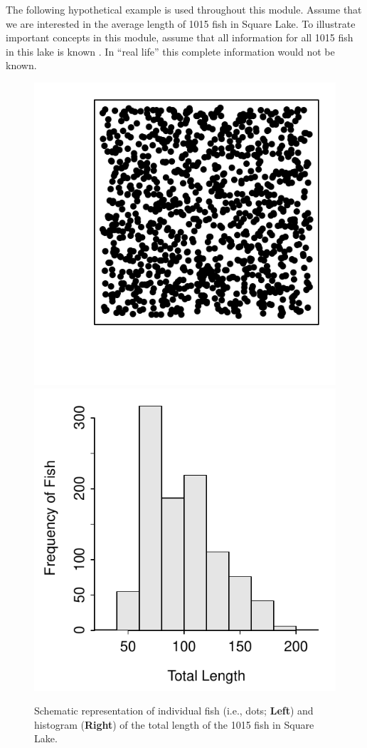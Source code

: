 \documentclass[10pt,openany]{book}\usepackage[]{graphicx}\usepackage[]{color}
\newenvironment{knitrout}{}{} %
\begin{document}
The following hypothetical example is used throughout this module. Assume that we are interested in the average length of 1015 fish in Square Lake. To illustrate important concepts in this module, assume that all information for all 1015 fish in this lake is known . In ``real life'' this complete information would not be known.

\begin{knitrout}
\color{fgcolor}\begin{figure}[hbtp]

{\centering \includegraphics[width=.4\linewidth]{Figs/SquareLakePopn-1} 
\includegraphics[width=.4\linewidth]{Figs/SquareLakePopn-2} 

}

\caption[Schematic representation of individual fish (i.e., dots]{Schematic representation of individual fish (i.e., dots; \textbf{Left}) and histogram (\textbf{Right}) of the total length of the 1015 fish in Square Lake.}\label{fig:SquareLakePopn}
\end{figure}


\end{knitrout}

\vspace{-24pt}
\end{document}
